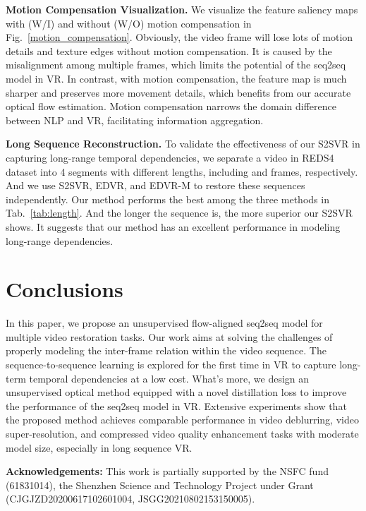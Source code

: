 \documentclass[nohyperref]{article}
\theoremstyle{plain}
\theoremstyle{definition}
\theoremstyle{remark}
\begin{document}
 \vspace{-1mm}
\noindent\textbf{Motion Compensation Visualization.}
We visualize the feature saliency maps with (W/I) and without (W/O) motion compensation in Fig.~\ref{motion_compensation}. Obviously, the video frame will lose lots of motion details and texture edges without motion compensation. It is caused by the misalignment among multiple frames, which limits the potential of the seq2seq  model in VR. In contrast, with motion compensation, the feature map is much sharper and preserves more movement details, which benefits from our accurate optical flow estimation. Motion compensation narrows the domain difference between NLP and VR, facilitating information aggregation.

\vspace{-1mm}
\noindent\textbf{Long Sequence Reconstruction.} 
To validate the effectiveness of our S2SVR in capturing long-range temporal dependencies, we separate a video in REDS4 dataset into 4 segments with different lengths, including  and  frames, respectively. And we use S2SVR, EDVR, and EDVR-M to restore these sequences independently. Our method performs the best among the three methods in Tab.~\ref{tab:length}. And the longer the sequence is, the more superior our S2SVR shows. It suggests that our method has an excellent performance in modeling long-range dependencies.


\vspace{-3mm}
\section{Conclusions}
\vspace{-1mm}
In this paper, we propose an unsupervised flow-aligned seq2seq model for multiple video restoration tasks. Our work aims at solving the challenges of properly modeling the inter-frame relation within the video sequence. The sequence-to-sequence learning is explored for the first time in VR to capture long-term temporal dependencies at a low cost. What's more, we design an unsupervised optical method equipped with a novel distillation loss to improve the performance of the seq2seq model in VR. Extensive experiments show that the proposed method achieves comparable performance in video deblurring, video super-resolution, and compressed video quality enhancement tasks with moderate model size, especially in long sequence VR.


\noindent\textbf{Acknowledgements:} 
This work is partially supported by the NSFC fund (61831014), the Shenzhen Science and Technology Project under Grant (CJGJZD20200617102601004, JSGG20210802153150005).




\end{document}
